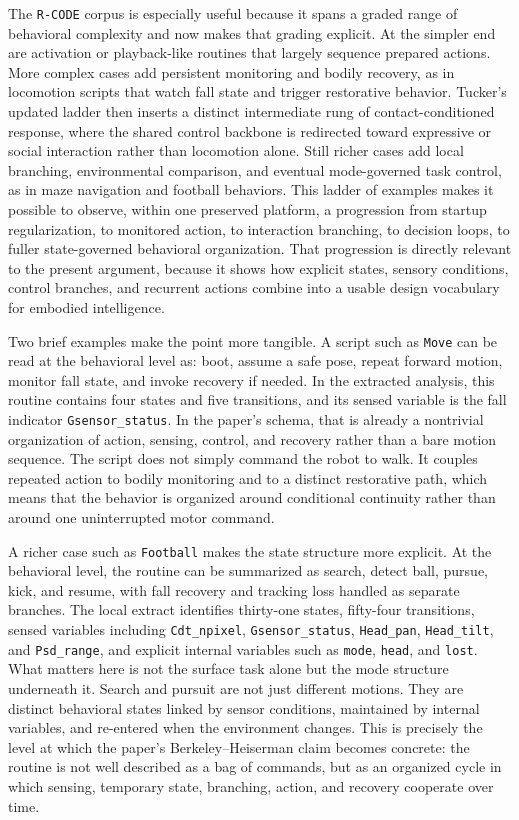 \documentclass[11pt]{article}
\begin{document}
The \texttt{R-CODE} corpus is especially useful because it spans a graded range of behavioral complexity and now makes that grading explicit. At the simpler end are activation or playback-like routines that largely sequence prepared actions. More complex cases add persistent monitoring and bodily recovery, as in locomotion scripts that watch fall state and trigger restorative behavior. Tucker's updated ladder then inserts a distinct intermediate rung of contact-conditioned response, where the shared control backbone is redirected toward expressive or social interaction rather than locomotion alone. Still richer cases add local branching, environmental comparison, and eventual mode-governed task control, as in maze navigation and football behaviors. This ladder of examples makes it possible to observe, within one preserved platform, a progression from startup regularization, to monitored action, to interaction branching, to decision loops, to fuller state-governed behavioral organization. That progression is directly relevant to the present argument, because it shows how explicit states, sensory conditions, control branches, and recurrent actions combine into a usable design vocabulary for embodied intelligence.

Two brief examples make the point more tangible. A script such as \texttt{Move} can be read at the behavioral level as: boot, assume a safe pose, repeat forward motion, monitor fall state, and invoke recovery if needed. In the extracted analysis, this routine contains four states and five transitions, and its sensed variable is the fall indicator \texttt{Gsensor\_status}. In the paper's schema, that is already a nontrivial organization of action, sensing, control, and recovery rather than a bare motion sequence. The script does not simply command the robot to walk. It couples repeated action to bodily monitoring and to a distinct restorative path, which means that the behavior is organized around conditional continuity rather than around one uninterrupted motor command.

A richer case such as \texttt{Football} makes the state structure more explicit. At the behavioral level, the routine can be summarized as search, detect ball, pursue, kick, and resume, with fall recovery and tracking loss handled as separate branches. The local extract identifies thirty-one states, fifty-four transitions, sensed variables including \texttt{Cdt\_npixel}, \texttt{Gsensor\_status}, \texttt{Head\_pan}, \texttt{Head\_tilt}, and \texttt{Psd\_range}, and explicit internal variables such as \texttt{mode}, \texttt{head}, and \texttt{lost}. What matters here is not the surface task alone but the mode structure underneath it. Search and pursuit are not just different motions. They are distinct behavioral states linked by sensor conditions, maintained by internal variables, and re-entered when the environment changes. This is precisely the level at which the paper's Berkeley--Heiserman claim becomes concrete: the routine is not well described as a bag of commands, but as an organized cycle in which sensing, temporary state, branching, action, and recovery cooperate over time.
\end{document}
